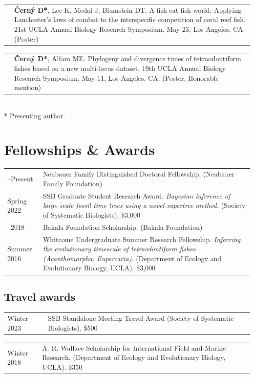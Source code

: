 \documentclass[10pt]{article}
\begin{document}
\begin{tabularx}{\textwidth}{>{\raggedleft\arraybackslash}p{2.2cm} X}
2018 & \textbf{\v{C}ern\'{y} D*}, Lee K, Medal J, Blumstein DT. A fish eat fish world: Applying Lanchester's laws of combat to the interspecific competition of coral reef fish. 21st UCLA Annual Biology Research Symposium, May 23, Los Angeles, CA. (Poster)
\end{tabularx}
\begin{tabularx}{\textwidth}{>{\raggedleft\arraybackslash}p{2.2cm} X}
2016 & \textbf{\v{C}ern\'{y} D*}, Alfaro ME. Phylogeny and divergence times of tetraodontiform fishes based on a new multi-locus dataset. 19th UCLA Annual Biology Research Symposium, May 11, Los Angeles, CA. (Poster, Honorable mention)
\end{tabularx} \\[1ex]

\hspace*{1.07cm} * Presenting author.

\section*{Fellowships \& Awards}

\begin{tabularx}{\textwidth}{>{\raggedleft\arraybackslash}p{2.2cm} X}
2018--Present & Neubauer Family Distinguished Doctoral Fellowship. (Neubauer Family Foundation) \\[0.1cm]
Spring 2022 & SSB Graduate Student Research Award. \textit{Bayesian inference of large-scale fossil time trees using a novel supertree method.} (Society of Systematic Biologists). \$3,000 \\[0.55cm]
2014--2018 & Bakala Foundation Scholarship. (Bakala Foundation) \\[0.1cm]
Summer 2016 & Whitcome Undergraduate Summer Research Fellowship. \textit{Inferring the evolutionary timescale of tetraodontiform fishes (Acanthomorpha: Eupercaria).} (Department of Ecology and Evolutionary Biology, UCLA). \$3,000
\end{tabularx}

\subsection*{Travel awards}

\begin{tabularx}{\textwidth}{>{\raggedleft\arraybackslash}p{2.2cm} X}
Winter 2023 & SSB Standalone Meeting Travel Award (Society of Systematic Biologists). \$500
\end{tabularx}
\begin{tabularx}{\textwidth}{>{\raggedleft\arraybackslash}p{2.2cm} X}
Winter 2018 & A. R. Wallace Scholarship for International Field and Marine Research. (Department of Ecology and Evolutionary Biology, UCLA). \$350
\end{tabularx}
\end{document}
